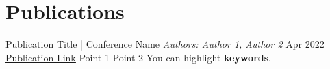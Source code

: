 \section{Publications}
\resumeSubHeadingListStart

\resumeProject
{Publication Title \textnormal{| Conference Name}}
{\emph{Authors: Author 1, Author 2}}
{Apr 2022}
{\href{publication-url}{\underline{Publication Link}}}
\vspace{0mm}
\resumeItemListStart
\point Point 1
\point Point 2
\point You can highlight \textbf{keywords}.
\resumeItemListEnd

\resumeSubHeadingListEnd
\vspace{-6.5mm}